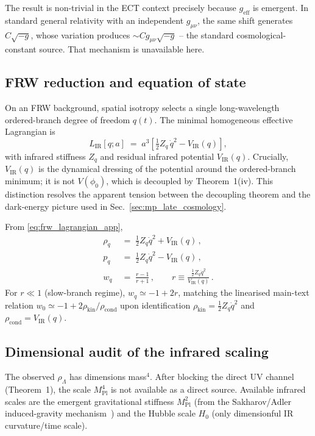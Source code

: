 The result is non-trivial in the ECT context precisely because
$g_{\mathrm{eff}}$ is emergent. In standard general relativity with
an independent $g_{\mu\nu}$, the same shift generates $C\sqrt{-g}$,
whose variation produces $\sim C g_{\mu\nu}\sqrt{-g}$ -- the standard
cosmological-constant source. That mechanism is unavailable here.


\subsection{FRW reduction and equation of state}
\label{app:frw_cc}

On an FRW background, spatial isotropy selects a single
long-wavelength ordered-branch degree of freedom $q(t)$. The
minimal homogeneous effective Lagrangian is
\begin{equation}
L_{\mathrm{IR}}[q; a] \;=\; a^3 \left[
\tfrac{1}{2} Z_q\, \dot q^2 - V_{\mathrm{IR}}(q) \right],
\label{eq:frw_lagrangian_app}
\end{equation}
with infrared stiffness $Z_q$ and residual infrared potential
$V_{\mathrm{IR}}(q)$. Crucially, $V_{\mathrm{IR}}(q)$ is the
dynamical dressing of the potential around the ordered-branch
minimum; it is not $V(\phi_0)$, which is decoupled by Theorem~1(iv).
This distinction resolves the apparent tension between the
decoupling theorem and the dark-energy picture used in
Sec.~\ref{sec:mp_late_cosmology}.

From \eqref{eq:frw_lagrangian_app},
\begin{align}
\rho_q &\;=\; \tfrac{1}{2} Z_q \dot q^2 + V_{\mathrm{IR}}(q)\,,
\\
p_q &\;=\; \tfrac{1}{2} Z_q \dot q^2 - V_{\mathrm{IR}}(q)\,,
\\
w_q &\;=\; \frac{r - 1}{r + 1}\,,
\qquad r \equiv
\frac{\tfrac12 Z_q \dot q^2}{V_{\mathrm{IR}}(q)}\,.
\end{align}
For $r \ll 1$ (slow-branch regime), $w_q \simeq -1 + 2r$,
matching the linearised main-text relation $w_0 \simeq -1 +
2\rho_{\mathrm{kin}}/\rho_{\mathrm{cond}}$ upon identification
$\rho_{\mathrm{kin}}=\tfrac12 Z_q\dot q^2$ and
$\rho_{\mathrm{cond}}=V_{\mathrm{IR}}(q)$.

\subsection{Dimensional audit of the infrared scaling}
\label{app:ir_audit_cc}

The observed $\rho_\Lambda$ has dimensions mass$^4$. After blocking
the direct UV channel (Theorem~1), the scale $M_{\mathrm{Pl}}^4$ is
not available as a direct source. Available infrared scales are the
emergent gravitational stiffness $M_{\mathrm{Pl}}^2$ (from the
Sakharov/Adler induced-gravity mechanism~\cite{Sakharov1967,Adler1982})
and the Hubble scale $H_0$ (only dimensionful IR curvature/time
scale).

